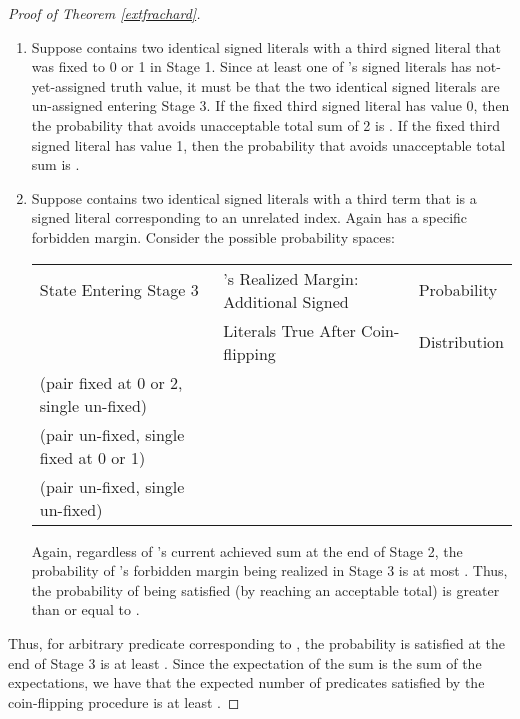\documentclass{article}
\begin{document}
\begin{proof}[Proof of Theorem \ref{extfrachard}]
\vspace{-3mm}

\begin{enumerate}
\item Suppose  contains two identical signed literals with a third signed literal that was fixed to 0 or 1 in Stage 1. Since at least one of 's signed literals has not-yet-assigned truth value, 
it must be that the two identical signed literals are un-assigned entering Stage 3. If the fixed third signed literal has value 0, then the probability that  avoids unacceptable total sum of 2 is . If the fixed third signed literal has value 1, then the probability that  avoids unacceptable total sum is .

\vspace{-2mm}

\item Suppose  contains two identical signed literals with a third term that is a signed literal corresponding to an unrelated index. Again  has a specific forbidden margin. Consider the possible probability spaces:


\begin{tabular}{|l|l|l|} \hline
State Entering Stage 3 & 's Realized Margin: Additional Signed  & Probability  \\
 & Literals True After Coin-flipping& Distribution  \\
\hline
(pair fixed at 0 or 2, single un-fixed)& &\\  
\hline
(pair un-fixed, single fixed at 0 or 1) & & \\ 
\hline
(pair un-fixed, single un-fixed) & & \\ 
\hline
\end{tabular}

Again, regardless of 's current achieved sum at the end of Stage 2, the probability of 's forbidden margin being realized in Stage 3 is at most . Thus, the probability of  being satisfied (by reaching an acceptable total) is greater than or equal to .
\end{enumerate}

\vspace{-2mm}
\noindent Thus, for arbitrary predicate  corresponding to , the probability  is satisfied at the end of Stage 3 is at least . Since the expectation of the sum is the sum of the expectations, we have that the expected number of predicates satisfied by the coin-flipping procedure is at least .  


\end{proof}
\end{document}
